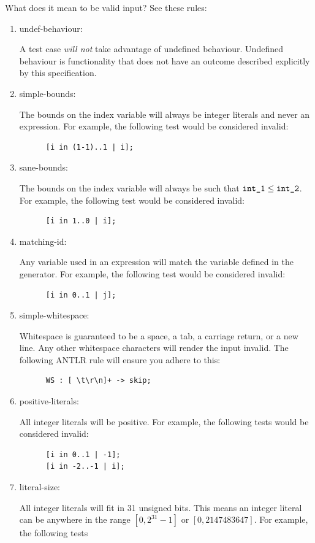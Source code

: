 \documentclass{article}
\newcommand{\code}[1]{\texttt{\textmd{#1}}}
\newcommand{\assertiondest}[1]{\hypertarget{#1}{#1:}}
\begin{document}
What does it mean to be valid input? See these rules:
\begin{enumerate}
  \item
    \assertiondest{undef-behaviour}
    A test case \textit{will not} take advantage of undefined behaviour. Undefined behaviour is
    functionality that does not have an outcome described explicitly by this specification.
  \item
    \assertiondest{simple-bounds}
    The bounds on the index variable will always be integer literals and never an expression. For
    example, the following test would be considered invalid:
    \begin{lstlisting}
      [i in (1-1)..1 | i];
    \end{lstlisting}
  \item
    \assertiondest{sane-bounds}
    The bounds on the index variable will always be such that $\code{int\_1} \leq
    \code{int\_2}$. For example, the following test would be considered invalid:
    \begin{lstlisting}
      [i in 1..0 | i];
    \end{lstlisting}
  \item
    \assertiondest{matching-id}
    Any variable used in an expression will match the variable defined in the generator. For
    example, the following test would be considered invalid:
    \begin{lstlisting}
      [i in 0..1 | j];
    \end{lstlisting}
  \item
    \assertiondest{simple-whitespace}
    Whitespace is guaranteed to be a space, a tab, a carriage return, or a new
    line. Any other whitespace characters will render the input invalid. The following ANTLR rule
    will ensure you adhere to this:
    \begin{lstlisting}
      WS : [ \t\r\n]+ -> skip;
    \end{lstlisting}
  \item
    \assertiondest{positive-literals}
    All integer literals will be positive. For example, the following tests would be considered
    invalid:
    \begin{lstlisting}
      [i in 0..1 | -1];
      [i in -2..-1 | i];
    \end{lstlisting}
  \item
    \assertiondest{literal-size}
    All integer literals will fit in 31 unsigned bits. This means an integer literal can be
    anywhere in the range $[0, 2^{31} - 1]$ or $[0, 2147483647]$. For example, the following tests

\end{enumerate}
\end{document}
